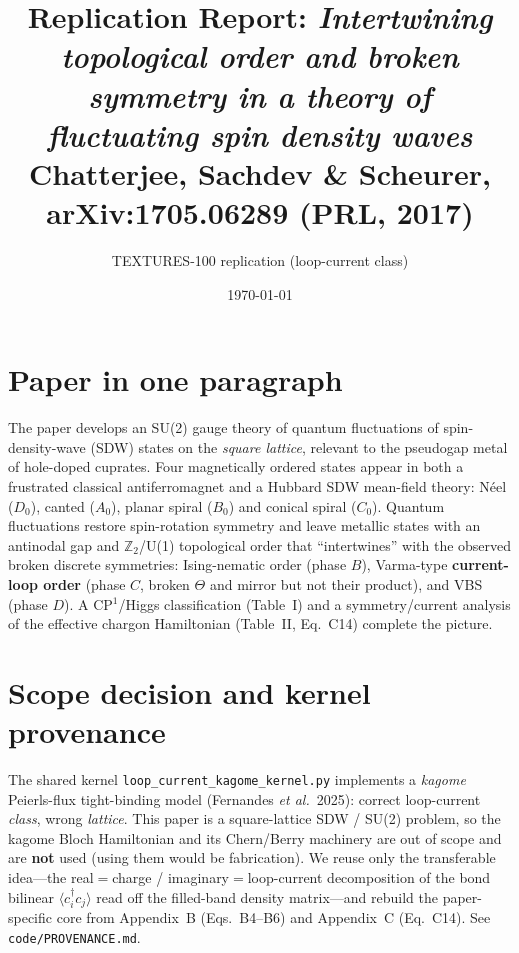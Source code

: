 \documentclass[11pt]{article}
\title{Replication Report: \emph{Intertwining topological order and broken
symmetry in a theory of fluctuating spin density waves}\\
\large Chatterjee, Sachdev \& Scheurer, arXiv:1705.06289 (PRL, 2017)}
\author{TEXTURES-100 replication (loop-current class)}
\date{\today}
\begin{document}
\maketitle

\section{Paper in one paragraph}
The paper develops an SU(2) gauge theory of quantum fluctuations of
spin-density-wave (SDW) states on the \emph{square lattice}, relevant to the
pseudogap metal of hole-doped cuprates. Four magnetically ordered states appear
in both a frustrated classical antiferromagnet and a Hubbard SDW mean-field
theory: N\'eel ($D_0$), canted ($A_0$), planar spiral ($B_0$) and conical spiral
($C_0$). Quantum fluctuations restore spin-rotation symmetry and leave metallic
states with an antinodal gap and $\mathbb{Z}_2$/U(1) topological order that
``intertwines'' with the observed broken discrete symmetries: Ising-nematic order
(phase $B$), Varma-type \textbf{current-loop order} (phase $C$, broken $\Theta$
and mirror but not their product), and VBS (phase $D$). A CP$^1$/Higgs
classification (Table~I) and a symmetry/current analysis of the effective
chargon Hamiltonian (Table~II, Eq.~C14) complete the picture.

\section{Scope decision and kernel provenance}
The shared kernel \texttt{loop\_current\_kagome\_kernel.py} implements a
\emph{kagome} Peierls-flux tight-binding model (Fernandes \emph{et al.}\ 2025):
correct loop-current \emph{class}, wrong \emph{lattice}. This paper is a
square-lattice SDW / SU(2) problem, so the kagome Bloch Hamiltonian and its
Chern/Berry machinery are out of scope and are \textbf{not} used (using them
would be fabrication). We reuse only the transferable idea---the
real$=$charge / imaginary$=$loop-current decomposition of the bond bilinear
$\langle c_i^\dagger c_j\rangle$ read off the filled-band density
matrix---and rebuild the paper-specific core from Appendix~B (Eqs.~B4--B6) and
Appendix~C (Eq.~C14). See \texttt{code/PROVENANCE.md}.
\end{document}
